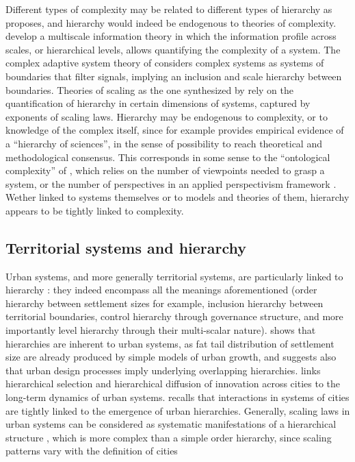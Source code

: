 \documentclass[english,fleqn,allpages]{ISTE_science}[2018/07/30]
\begin{document}
Different types of complexity may be related to different types of hierarchy as \cite{raimbault:halshs-02089520} proposes, and hierarchy would indeed be endogenous to theories of complexity. \cite{allen2017multiscale} develop a multiscale information theory in which the information profile across scales, or hierarchical levels, allows quantifying the complexity of a system. The complex adaptive system theory of \cite{holland2012signals} considers complex systems as systems of boundaries that filter signals, implying an inclusion and scale hierarchy between boundaries. Theories of scaling as the one synthesized by \cite{west2017scale} rely on the quantification of hierarchy in certain dimensions of systems, captured by exponents of scaling laws. Hierarchy may be endogenous to complexity, or to knowledge of the complex itself, since for example \cite{fanelli2013bibliometric} provides empirical evidence of a ``hierarchy of sciences'', in the sense of possibility to reach theoretical and methodological consensus. This corresponds in some sense to the ``ontological complexity'' of \cite{pumain2003approche}, which relies on the number of viewpoints needed to grasp a system, or the number of perspectives in an applied perspectivism framework \citep{raimbault2020relating}. Wether linked to systems themselves or to models and theories of them, hierarchy appears to be tightly linked to complexity.



\subsection{Territorial systems and hierarchy}


Urban systems, and more generally territorial systems, are particularly linked to hierarchy \citep{pumain2006hierarchy}: they indeed encompass all the meanings aforementioned (order hierarchy between settlement sizes for example, inclusion hierarchy between territorial boundaries, control hierarchy through governance structure, and more importantly level hierarchy through their multi-scalar nature). \cite{batty2006hierarchy} shows that hierarchies are inherent to urban systems, as fat tail distribution of settlement size are already produced by simple models of urban growth, and suggests also that urban design processes imply underlying overlapping hierarchies. \cite{pumain2006alternative} links hierarchical selection and hierarchical diffusion of innovation across cities to the long-term dynamics of urban systems. \cite{pumain:halshs-02303136} recalls that interactions in systems of cities are tightly linked to the emergence of urban hierarchies. Generally, scaling laws in urban systems can be considered as systematic manifestations of a hierarchical structure \citep{pumain2004scaling}, which is more complex than a simple order hierarchy, since scaling patterns vary with the definition of cities \citep{cottineau2017diverse}
\end{document}
